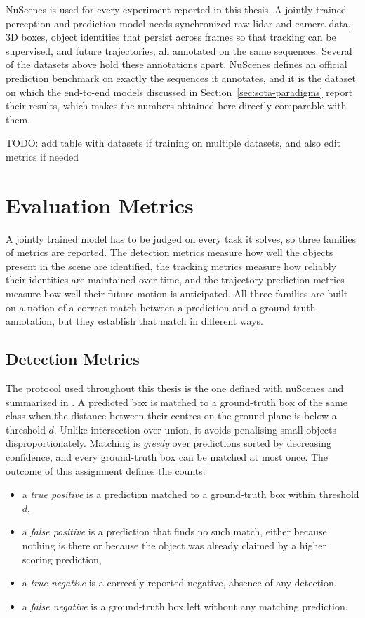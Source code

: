 NuScenes is used for every experiment reported in this thesis. A jointly trained perception and prediction
model needs synchronized raw \ac{lidar} and camera data, 3D boxes, object identities that persist across
frames so that tracking can be supervised, and future trajectories, all annotated on the same sequences.
Several of the datasets above hold these annotations apart. NuScenes defines an official prediction benchmark on exactly the
sequences it annotates, and it is the dataset on which the end-to-end models discussed in
Section~\ref{sec:sota-paradigms} report their results, which makes the numbers obtained here directly
comparable with them.

TODO: add table with datasets if training on multiple datasets, and also edit metrics if needed


\section{Evaluation Metrics}
\label{sec:sota-metrics}

A jointly trained model has to be judged on every task it solves, so three families of metrics are
reported. The detection metrics measure how well the objects present in the scene are identified, the
tracking metrics measure how reliably their identities are maintained over time, and the trajectory
prediction metrics measure how well their future motion is anticipated. All three families are built on a
notion of a correct match between a prediction and a ground-truth annotation, but they establish that match
in different ways.

\subsection{Detection Metrics}
\label{subsec:sota-metrics-det}

The protocol used throughout this thesis is the one defined with nuScenes \cite{Caesar2020nuScenes} and 
summarized in \cite{Valverde2025Detection}. A
predicted box is matched to a ground-truth box of the same class when the distance between their centres on
the ground plane is below a threshold \(d\). Unlike intersection over union, it avoids penalising small objects disproportionately. Matching is \emph{greedy} over
predictions sorted by decreasing confidence, and every ground-truth box can be matched at most once. The
outcome of this assignment defines the counts:

\begin{itemize}
    \item a \emph{true positive} is a prediction matched to a ground-truth box within threshold \(d\),
    \item a \emph{false positive} is a prediction that finds no such match, either because nothing is there
    or because the object was already claimed by a higher scoring prediction,
    \item a \emph{true negative} is a correctly reported negative, absence of any detection. 
    \item a \emph{false negative} is a ground-truth box left without any matching prediction.
\end{itemize}

